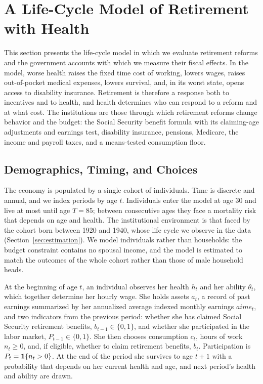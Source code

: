 \section{A Life-Cycle Model of Retirement with Health}\label{sec:model}

This section presents the life-cycle model in which we evaluate retirement reforms and the government accounts with which we measure their fiscal effects. In the model, worse health raises the fixed time cost of working, lowers wages, raises out-of-pocket medical expenses, lowers survival, and, in its worst state, opens access to disability insurance. Retirement is therefore a response both to incentives and to health, and health determines who can respond to a reform and at what cost. The institutions are those through which retirement reforms change behavior and the budget: the Social Security benefit formula with its claiming-age adjustments and earnings test, disability insurance, pensions, Medicare, the income and payroll taxes, and a means-tested consumption floor.

\subsection{Demographics, Timing, and Choices}\label{sec:model_timing}

The economy is populated by a single cohort of individuals. Time is discrete and annual, and we index periods by age $t$. Individuals enter the model at age 30 and live at most until age $T=85$; between consecutive ages they face a mortality risk that depends on age and health. The institutional environment is that faced by the cohort born between 1920 and 1940, whose life cycle we observe in the data (Section~\ref{sec:estimation}). We model individuals rather than households: the budget constraint contains no spousal income, and the model is estimated to match the outcomes of the whole cohort rather than those of male household heads.

At the beginning of age $t$, an individual observes her health $h_t$ and her ability $\theta_t$, which together determine her hourly wage. She holds assets $a_t$, a record of past earnings summarized by her annualized average indexed monthly earnings $aime_t$, and two indicators from the previous period: whether she has claimed Social Security retirement benefits, $b_{t-1}\in\{0,1\}$, and whether she participated in the labor market, $P_{t-1}\in\{0,1\}$. She then chooses consumption $c_t$, hours of work $n_t\geq 0$, and, if eligible, whether to claim retirement benefits, $b_t$. Participation is $P_t=\mathbf{1}\{n_t>0\}$. At the end of the period she survives to age $t+1$ with a probability that depends on her current health and age, and next period's health and ability are drawn.

